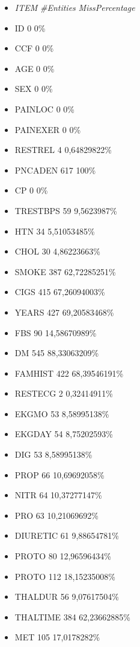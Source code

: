 \documentclass[a4paper,12pt]{article}
\begin{document}
\begin{itemize}
\begin{itemize}
                \item \textit{ITEM}	\textit{\#Entities}	\textit{MissPercentage}
                \item ID	0	0\%
                \item CCF	0	0\%
                \item AGE	0	0\%
                \item SEX	0	0\%
                \item PAINLOC	0	0\%
                \item PAINEXER	0	0\%
                \item RESTREL	4	0,64829822\%
                \item PNCADEN	617	100\%
                \item CP	0	0\%
                \item TRESTBPS	59	9,5623987\%
                \item HTN	34	5,51053485\%
                \item CHOL	30	4,86223663\%
                \item SMOKE	387	62,72285251\%
                \item CIGS	415	67,26094003\%
                \item YEARS	427	69,20583468\%
                \item FBS	90	14,58670989\%
                \item DM	545	88,33063209\%
                \item FAMHIST	422	68,39546191\%
                \item RESTECG	2	0,32414911\%
                \item EKGMO	53	8,58995138\%
                \item EKGDAY	54	8,75202593\%
                \item DIG	53	8,58995138\%
                \item PROP	66	10,69692058\%
                \item NITR	64	10,37277147\%
                \item PRO	63	10,21069692\%
                \item DIURETIC	61	9,88654781\%
                \item PROTO	80	12,96596434\%
                \item PROTO	112	18,15235008\%
                \item THALDUR	56	9,07617504\%
                \item THALTIME	384	62,23662885\%
                \item MET	105	17,0178282\%

\end{itemize}
\end{itemize}
\end{document}
